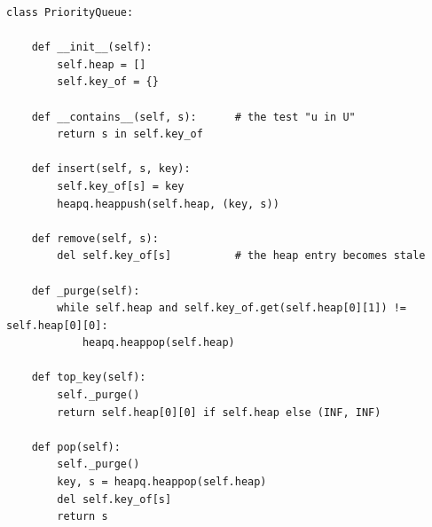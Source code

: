 \begin{lstlisting}[caption={The priority queue with lazy deletion (from \code{code/ch05\_dstar\_lite.py}).},label={lst:ch05-queue}]
class PriorityQueue:

    def __init__(self):
        self.heap = []
        self.key_of = {}

    def __contains__(self, s):      # the test "u in U"
        return s in self.key_of

    def insert(self, s, key):
        self.key_of[s] = key
        heapq.heappush(self.heap, (key, s))

    def remove(self, s):
        del self.key_of[s]          # the heap entry becomes stale

    def _purge(self):
        while self.heap and self.key_of.get(self.heap[0][1]) != self.heap[0][0]:
            heapq.heappop(self.heap)

    def top_key(self):
        self._purge()
        return self.heap[0][0] if self.heap else (INF, INF)

    def pop(self):
        self._purge()
        key, s = heapq.heappop(self.heap)
        del self.key_of[s]
        return s
\end{lstlisting}

